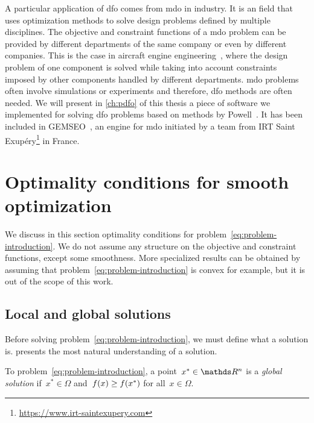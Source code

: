 A particular application of \gls{dfo} comes from \gls{mdo} in industry.
It is an field that uses optimization methods to solve design problems defined by multiple disciplines.
The objective and constraint functions of a \gls{mdo} problem can be provided by different departments of the same company or even by different companies.
This is the case in aircraft engine engineering~\cite{Gazaix_Etal_2019}, where the design problem of one component is solved while taking into account constraints imposed by other components handled by different departments.
\Gls{mdo} problems often involve simulations or experiments and therefore, \gls{dfo} methods are often needed.
We will present in \cref{ch:pdfo} of this thesis a piece of software we implemented for solving \gls{dfo} problems based on methods by Powell~\cite{Powell_1994,Powell_2002,Powell_2006,Powell_2009,Powell_2015}.
It has been included in GEMSEO~\cite{Gallard_Etal_2018}, an engine for \gls{mdo} initiated by a team from IRT Saint Exup{\'{e}}ry\footnote{\url{https://www.irt-saintexupery.com}} in France.

\section{Optimality conditions for smooth optimization}

We discuss in this section optimality conditions for problem~\cref{eq:problem-introduction}.
We do not assume any structure on the objective and constraint functions, except some smoothness.
More specialized results can be obtained by assuming that problem~\cref{eq:problem-introduction} is convex for example, but it is out of the scope of this work.

\subsection{Local and global solutions}

Before solving problem~\cref{eq:problem-introduction}, we must define what a solution is.
 presents the most natural understanding of a solution.

\begin{definition}
    \label{def:global-solution}
    To problem~\cref{eq:problem-introduction}, a point~$x^{\ast} \in \R^n$ is a \emph{global solution} if~$x^{\ast} \in \Omega$ and~$f(x) \ge f(x^{\ast})$ for all~$x \in \Omega$.
\end{definition}

